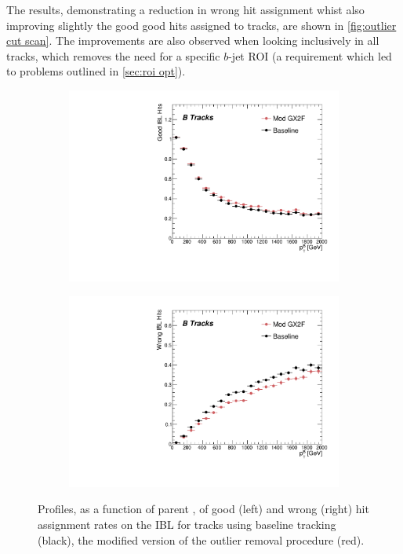 The results, demonstrating a reduction in wrong hit assignment whist also improving slightly the good good hits assigned to tracks, are shown in \cref{fig:outlier cut scan}. The improvements are also observed when looking inclusively in all tracks, which removes the need for a specific $b$-jet ROI (a requirement which led to problems outlined in \cref{sec:roi opt}).
%
\begin{figure}[!htbp]
    \centering
    \begin{subfigure}{.5\textwidth}
      \centering
      \includegraphics[width=\textwidth]{chapters/3.tracking/figs/p_nGoodHitsIBL_pTB_From_B.pdf}
    \end{subfigure}%
    \begin{subfigure}{.5\textwidth}
      \centering
      \includegraphics[width=\textwidth]{chapters/3.tracking/figs/p_nWrongHitsIBL_pTB_From_B.pdf}
    \end{subfigure}
    \caption{Profiles, as a function of parent \bhadron \pt, of good (left) and wrong (right) hit assignment rates on the IBL for tracks using baseline tracking (black), the modified version of the outlier removal procedure (red).}
    \label{fig:gx2f_opt_hits}
\end{figure}
